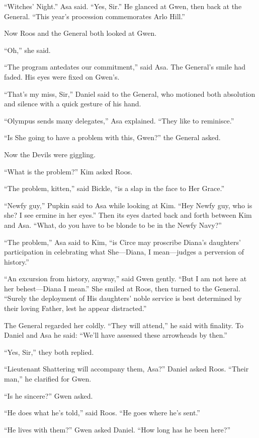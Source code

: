 \documentclass[11pt,a5paper]{article}
\begin{document}
``Witches' Night.'' Asa said. ``Yes, Sir.'' He glanced at Gwen, then back at the General. ``This year's procession commemorates Arlo Hill.''

Now Roos and the General both looked at Gwen.

``Oh,'' she said.

``The program antedates our commitment,'' said Asa. The General's smile had faded. His eyes were fixed on Gwen's.

``That's my miss, Sir,'' Daniel said to the General, who motioned both absolution and silence with a quick gesture of his hand.

``Olympus sends many delegates,'' Asa explained. ``They like to reminisce.''

``Is She going to have a problem with this, Gwen?'' the General asked.

Now the Devils were giggling.

``What is the problem?'' Kim asked Roos.

``The problem, kitten,'' said Bickle, ``is a slap in the face to Her Grace.''

``Newfy guy,'' Pupkin said to Asa while looking at Kim. ``Hey Newfy guy, who is she? I see ermine in her eyes.'' Then its eyes darted back and forth between Kim and Asa. ``What, do you have to be blonde to be in the Newfy Navy?''

``The problem,'' Asa said to Kim, ``is Circe may proscribe Diana's daughters' participation in celebrating what She---Diana, I mean---judges a perversion of history.''

``An excursion from history, anyway,'' said Gwen gently. ``But I am not here at her behest---Diana I mean.'' She smiled at Roos, then turned to the General. ``Surely the deployment of His daughters' noble service is best determined by their loving Father, lest he appear distracted.''

 The General regarded her coldly. ``They will attend,'' he said with finality. To Daniel and Asa he said: ``We'll have assessed these arrowheads by then.''

``Yes, Sir,'' they both replied.

``Lieutenant Shattering will accompany them, Asa?'' Daniel asked Roos. ``Their man,'' he clarified for Gwen.

 ``Is he sincere?'' Gwen asked.

 ``He does what he's told,'' said Roos. ``He goes where he's sent.''

 ``He lives with them?'' Gwen asked Daniel. ``How long has he been here?''
\end{document}
